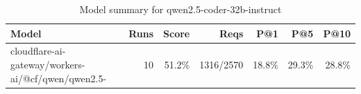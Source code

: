 \begin{table}[htbp]
\centering
\begin{tabular}{lrrrrrr}
\toprule
Model & Runs & Score & Reqs & P@1 & P@5 & P@10 \\
\midrule
cloudflare-ai-gateway/workers-ai/@cf/qwen/qwen2.5- & 10 & 51.2\% & 1316/2570 & 18.8\% & 29.3\% & 28.8\% \\
\bottomrule
\end{tabular}
\caption{Model summary for qwen2.5-coder-32b-instruct}
\end{table}

